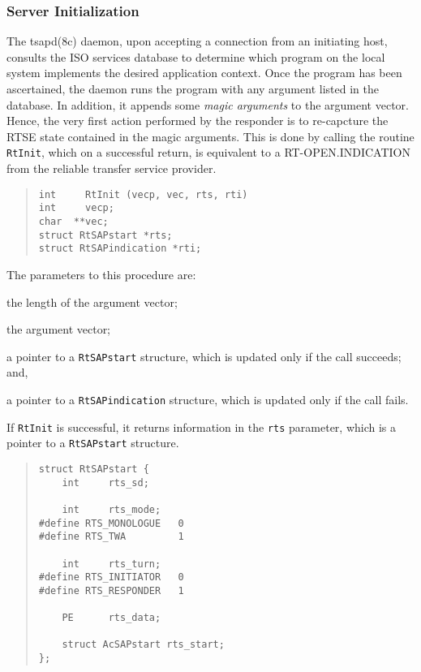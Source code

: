 \subsubsection	{Server Initialization}
The \man tsapd(8c) daemon,
upon accepting a connection from an initiating host,
consults the ISO services database to determine which program
on the local system implements the desired application context.
Once the program has been ascertained,
the daemon runs the program with any argument listed in the database.
In addition,
it appends some {\em magic arguments\/} to the argument vector.
Hence,
the very first action performed by the responder is to re-capcture the RTSE
state contained in the magic arguments.
This is done by calling the routine \verb"RtInit",
which on a successful return,
is equivalent to a {\sf RT-OPEN.INDICATION\/} from the reliable transfer
service provider.
\begin{quote}\small\begin{verbatim}
int     RtInit (vecp, vec, rts, rti)
int     vecp;
char  **vec;
struct RtSAPstart *rts;
struct RtSAPindication *rti;
\end{verbatim}\end{quote}
The parameters to this procedure are:
\begin{describe}
\item[\verb"vecp":] the length of the argument vector;

\item[\verb"vec":] the argument vector;

\item[\verb"rts":] a pointer to a \verb"RtSAPstart" structure,
which is updated only if the call succeeds;
and,

\item[\verb"rti":] a pointer to a \verb"RtSAPindication" structure,
which is updated only if the call fails.
\end{describe}
If \verb"RtInit" is successful,
it returns information in the \verb"rts" parameter,
which is a pointer to a \verb"RtSAPstart" structure.
\begin{quote}\small\begin{verbatim}
struct RtSAPstart {
    int     rts_sd;

    int     rts_mode;
#define RTS_MONOLOGUE   0
#define RTS_TWA         1

    int     rts_turn;
#define RTS_INITIATOR   0
#define RTS_RESPONDER   1

    PE      rts_data;

    struct AcSAPstart rts_start;
};
\end{verbatim}\end{quote}
